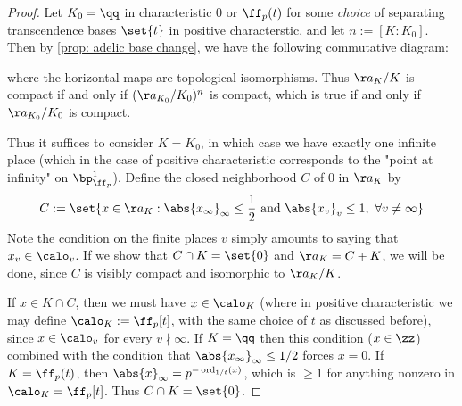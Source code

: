\documentclass[11pt, x11names, openany]{book}
\begin{document}
\begin{proof}
Let $K_0 = \qq$ in characteristic 0 or $\ff_p(t)$ for some \textit{choice} of separating transcendence bases $\set{t}$ in positive characterstic, and let $n := [K: K_0]$. Then by \ref{prop: adelic base change}, we have the following commutative diagram:
\begin{center}
\end{center}
where the horizontal maps are topological isomorphisms. Thus $\aa_K/K$ is compact if and only if $(\aa_{K_0}/K_0)^n$ is compact, which is true if and only if $\aa_{K_0}/K_0$ is compact.

Thus it suffices to consider $K=K_0$, in which case we have exactly one infinite place (which in the case of positive characteristic corresponds to the "point at infinity" on $\bp^1_{\ff_p}$). Define the closed neighborhood $C$ of 0 in $\aa_K$ by 
\begin{equation*}
    C := \set{x \in \aa_K : \abs{x_\infty}_\infty \leq \frac{1}{2} \text{ and } \abs{x_v}_v \leq 1, \ \forall v \neq \infty}
\end{equation*}
Note the condition on the finite places $v$ simply amounts to saying that $x_v \in \calo_v$. If we show that $C \cap K = \set{0}$ and $\aa_K = C+K$, we will be done, since $C$ is visibly compact and isomorphic to $\aa_K/K$.

If $x \in K \cap C$, then we must have $x \in \calo_K$ (where in positive characteristic we may define $\calo_K := \ff_p[t]$, with the same choice of $t$ as discussed before), since $x \in \calo_v$ for every $v \nmid \infty$. If $K = \qq$ then this condition ($x \in \zz$) combined with the condition that $\abs{x_\infty}_\infty \leq 1/2$ forces $x = 0$. If $K = \ff_p(t)$, then $\abs{x}_\infty  = p^{-\ord_{1/t}(x)}$, which is $\geq 1$ for anything nonzero in $\calo_K = \ff_p[t]$. Thus $C \cap K = \set{0}$.


\end{proof}
\end{document}
